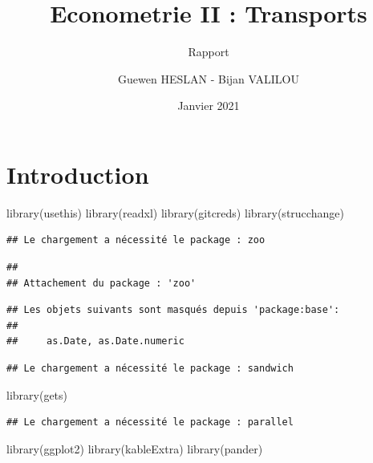 \documentclass[
]{article}
\title{Econometrie II : Transports}
\subtitle{Rapport}
\author{Guewen HESLAN - Bijan VALILOU}
\date{Janvier 2021}
\newenvironment{Shaded}{\begin{snugshade}}{\end{snugshade}}
\newcommand{\FunctionTok}[1]{\textcolor[rgb]{0.00,0.00,0.00}{#1}}
\newcommand{\NormalTok}[1]{#1}
\begin{document}
\maketitle

{
\setcounter{tocdepth}{2}
\tableofcontents
}
\newpage

\hypertarget{introduction}{%
\section{Introduction}\label{introduction}}

\begin{Shaded}
\begin{Highlighting}[]
\FunctionTok{library}\NormalTok{(usethis)}
\FunctionTok{library}\NormalTok{(readxl)}
\FunctionTok{library}\NormalTok{(gitcreds)}
\FunctionTok{library}\NormalTok{(strucchange)}
\end{Highlighting}
\end{Shaded}

\begin{verbatim}
## Le chargement a nécessité le package : zoo
\end{verbatim}

\begin{verbatim}
## 
## Attachement du package : 'zoo'
\end{verbatim}

\begin{verbatim}
## Les objets suivants sont masqués depuis 'package:base':
## 
##     as.Date, as.Date.numeric
\end{verbatim}

\begin{verbatim}
## Le chargement a nécessité le package : sandwich
\end{verbatim}

\begin{Shaded}
\begin{Highlighting}[]
\FunctionTok{library}\NormalTok{(gets)}
\end{Highlighting}
\end{Shaded}

\begin{verbatim}
## Le chargement a nécessité le package : parallel
\end{verbatim}

\begin{Shaded}
\begin{Highlighting}[]
\FunctionTok{library}\NormalTok{(ggplot2)}
\FunctionTok{library}\NormalTok{(kableExtra)}
\FunctionTok{library}\NormalTok{(pander)}
\end{Highlighting}
\end{Shaded}
\end{document}

